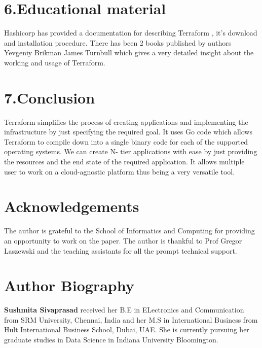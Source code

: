 \documentclass[9pt,twocolumn,twoside]{../../styles/osajnl}
\begin{document}
\section{6.Educational material}

Hashicorp has provided a documentation for describing Terraform , it's
download and installation procedure. There has been 2 books published
by authors Yevgeniy Brikman\cite{www-terraform-upandrunning} James
Turnbull\cite{www-terraform-book} which gives a very detailed insight
about the working and usage of Terraform.

\section{7.Conclusion}
Terraform simplifies the process of creating applications and
implementing the infrastructure by just specifying the required
goal. It uses Go code which allows Terraform to compile down into a
single binary code for each of the supported operating systems. We can
create N- tier applications with ease by just providing the resources
and the end state of the required application. It allows multiple user
to work on a cloud-agnostic platform thus being a very versatile tool.

\section*{Acknowledgements}
The author is grateful to the School of Informatics and Computing for
providing an opportunity to work on the paper. The author is thankful
to Prof Gregor Laszewski and the teaching assistants for all the
prompt technical support.



\section{Author Biography}

{\bfseries Sushmita Sivaprasad} received her B.E in ELectronics and
Communication from SRM University, Chennai, India and her M.S in
International Business from Hult International Business School, Dubai,
UAE. She is currently pursuing her graduate studies in Data Science in
Indiana University Bloomington.
\end{document}
